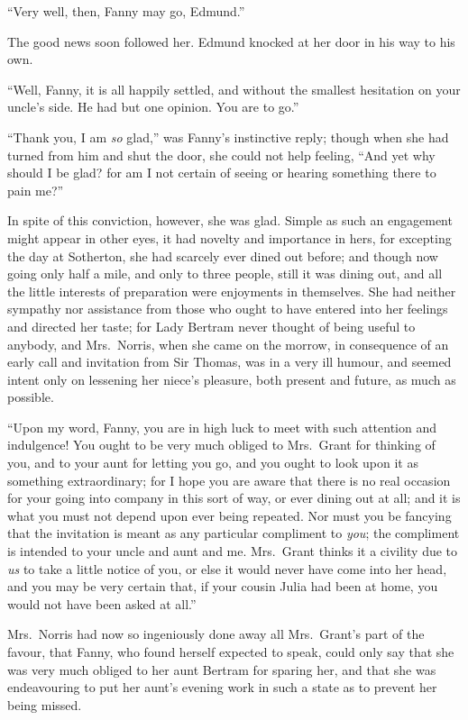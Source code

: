 ``Very well, then, Fanny may go, Edmund.''

The good news soon followed her.  Edmund knocked at her
door in his way to his own.

``Well, Fanny, it is all happily settled, and without
the smallest hesitation on your uncle's side.
He had but one opinion.  You are to go.''

``Thank you, I am \emph{so} glad,'' was Fanny's instinctive reply;
though when she had turned from him and shut the door,
she could not help feeling, ``And yet why should I be glad?
for am I not certain of seeing or hearing something there
to pain me?''

In spite of this conviction, however, she was glad.
Simple as such an engagement might appear in other eyes,
it had novelty and importance in hers, for excepting the
day at Sotherton, she had scarcely ever dined out before;
and though now going only half a mile, and only to
three people, still it was dining out, and all the little
interests of preparation were enjoyments in themselves.
She had neither sympathy nor assistance from those who ought
to have entered into her feelings and directed her taste;
for Lady Bertram never thought of being useful to anybody,
and Mrs.\ Norris, when she came on the morrow, in consequence
of an early call and invitation from Sir Thomas, was in
a very ill humour, and seemed intent only on lessening
her niece's pleasure, both present and future, as much
as possible.

``Upon my word, Fanny, you are in high luck to meet
with such attention and indulgence!  You ought to be
very much obliged to Mrs.\ Grant for thinking of you,
and to your aunt for letting you go, and you ought to look
upon it as something extraordinary; for I hope you are
aware that there is no real occasion for your going into
company in this sort of way, or ever dining out at all;
and it is what you must not depend upon ever being repeated.
Nor must you be fancying that the invitation is meant
as any particular compliment to \emph{you}; the compliment
is intended to your uncle and aunt and me.  Mrs.\ Grant
thinks it a civility due to \emph{us} to take a little notice
of you, or else it would never have come into her head,
and you may be very certain that, if your cousin Julia
had been at home, you would not have been asked at all.''

Mrs.\ Norris had now so ingeniously done away all
Mrs.\ Grant's part of the favour, that Fanny, who found
herself expected to speak, could only say that she was
very much obliged to her aunt Bertram for sparing her,
and that she was endeavouring to put her aunt's evening
work in such a state as to prevent her being missed.

